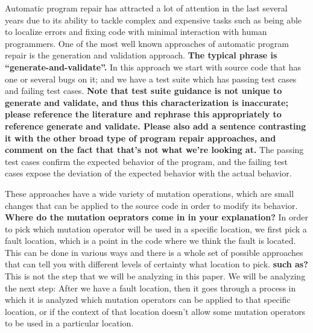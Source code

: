 \documentclass[conference]{IEEEtran}
\newcommand{\todo}[1]
  {{\scriptsize \textbf{\color{red} {#1}}}}
\begin{document}
Automatic program repair has attracted a lot of attention in the last several
years due to its ability to tackle complex and expensive tasks such as being
able to localize errors and fixing code with minimal interaction with human
programmers. One of the most well known approaches of automatic program repair
is the generation and validation approach.\todo{The typical phrase is
  ``generate-and-validate''.}  In this approach we start with source
code that has one or several bugs on it; and we have a test suite which has
passing test cases and failing test cases.\todo{Note that test suite guidance is
  not unique to generate and validate, and thus this characterization is inaccurate; please reference the literature and
  rephrase this appropriately to reference generate and validate.  Please also
  add a sentence contrasting it with the other broad type of program repair
  approaches, and comment on the fact that that's not what we're looking at.}  The passing test cases confirm the
expected behavior of the program, and the failing test cases expose the
deviation of the expected behavior with the actual behavior. 


These approaches have a wide variety of mutation operations, which are small
changes that can be applied to the source code in order to modify its
behavior.\todo{Where do the mutation oeprators come in in your explanation?} In
order to pick which mutation operator will be used in a specific location, we
first pick a fault location, which is a point in the code where we think the
fault is located. This can be done in various ways and there is a whole set of
possible approaches that can tell you with different levels of certainty what
location to pick.\todo{such as?} This is not the step that we will be analyzing in this
paper. We will be analyzing the next step: After we have a fault location, then
it goes through a process in which it is analyzed which mutation operators can
be applied to that specific location, or if the context of that location doesn't
allow some mutation operators to be used in a particular location. 
\end{document}
